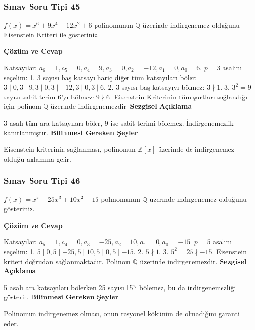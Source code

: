 \documentclass[11pt, a4paper]{article}
\newenvironment{cozum}{
    \vspace{0.5cm}
    \noindent\textcolor{green!60!black}{\faCheckCircle\enspace \textbf{\Large Çözüm ve Cevap}}\par\vspace{0.2cm}
}{}
\newenvironment{sezgisel}{
    \vspace{0.5cm}
    \noindent\textcolor{orange!80!black}{\faLightbulb\enspace \textbf{\Large Sezgisel Açıklama}}\par\vspace{0.2cm}
    \itshape
}{}
\newenvironment{bilgi}{
    \vspace{0.5cm}
    \noindent\textcolor{red!70!black}{\faExclamationTriangle\enspace \textbf{\Large Bilinmesi Gereken Şeyler}}\par\vspace{0.2cm}
}{}
\begin{document}
\newpage
\subsubsection{Sınav Soru Tipi 45}
\begin{sinavbox}
$f(x) = x^6+9x^4-12x^2+6$ polinomunun $\mathbb{Q}$ üzerinde indirgenemez olduğunu Eisenstein Kriteri ile gösteriniz.
\end{sinavbox}
\begin{cozum}
Katsayılar: $a_6 = 1, a_5=0, a_4=9, a_3=0, a_2=-12, a_1=0, a_0=6$.
$p=3$ asalını seçelim:
1. $3$ sayısı baş katsayı hariç diğer tüm katsayıları böler:
   $3 \mid 0, 3 \mid 9, 3 \mid 0, 3 \mid -12, 3 \mid 0, 3 \mid 6$.
2. $3$ sayısı baş katsayıyı bölmez: $3 \nmid 1$.
3. $3^2 = 9$ sayısı sabit terim $6$'yı bölmez: $9 \nmid 6$.
Eisenstein Kriterinin tüm şartları sağlandığı için polinom $\mathbb{Q}$ üzerinde indirgenemezdir.
\end{cozum}
\begin{sezgisel}
3 asalı tüm ara katsayıları böler, 9 ise sabit terimi bölemez. İndirgenemezlik kanıtlanmıştır.
\end{sezgisel}
\begin{bilgi}
Eisenstein kriterinin sağlanması, polinomun $\mathbb{Z}[x]$ üzerinde de indirgenemez olduğu anlamına gelir.
\end{bilgi}

\newpage
\subsubsection{Sınav Soru Tipi 46}
\begin{sinavbox}
$f(x) = x^5-25x^3+10x^2-15$ polinomunun $\mathbb{Q}$ üzerinde indirgenemez olduğunu gösteriniz.
\end{sinavbox}
\begin{cozum}
Katsayılar: $a_5=1, a_4=0, a_3=-25, a_2=10, a_1=0, a_0=-15$.
$p=5$ asalını seçelim:
1. $5 \mid 0, 5 \mid -25, 5 \mid 10, 5 \mid 0, 5 \mid -15$.
2. $5 \nmid 1$.
3. $5^2 = 25 \nmid -15$.
Eisenstein kriteri doğrudan sağlanmaktadır. Polinom $\mathbb{Q}$ üzerinde indirgenemezdir.
\end{cozum}
\begin{sezgisel}
5 asalı ara katsayıları bölerken 25 sayısı 15'i bölemez, bu da indirgenemezliği gösterir.
\end{sezgisel}
\begin{bilgi}
Polinomun indirgenemez olması, onun rasyonel kökünün de olmadığını garanti eder.
\end{bilgi}
\end{document}
